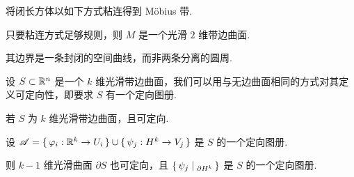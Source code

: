 \begin{example}
    将闭长方体以如下方式粘连得到 Möbius 带.


    只要粘连方式足够规则，则 $M$ 是一个光滑 $2$ 维带边曲面.
    
    其边界是一条封闭的空间曲线，而非两条分离的圆周.
\end{example}


设 $S\subset\mathbb{R}^n$ 是一个 $k$ 维光滑带边曲面，我们可以用与无边曲面相同的方式对其定义可定向性，即要求 $S$ 有一个定向图册.

\begin{property}
    若 $S$ 为 $k$ 维光滑带边曲面，且可定向.

    设 $\mathscr{A}=\set{\varphi_i:\mathbb{R}^k\to U_i}\cup\set{\psi_j:H^k\to V_j}$ 是 $S$ 的一个定向图册.

    则 $k-1$ 维光滑曲面 $\partial S$ 也可定向，且 $\set{\psi_j|_{\partial H^k}}$ 是 $S$ 的一个定向图册.
\end{property}
